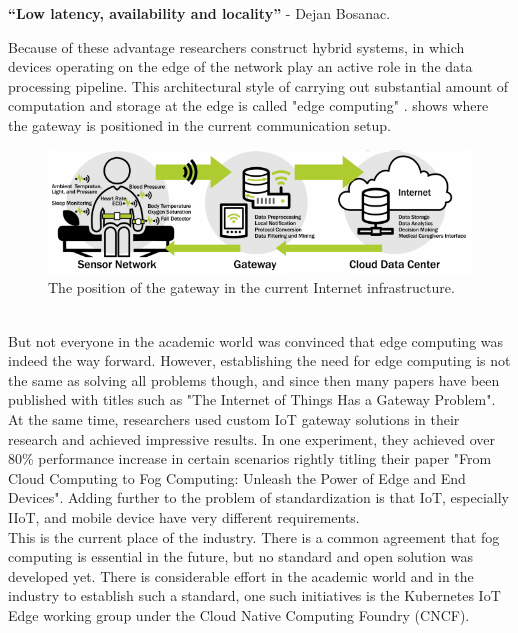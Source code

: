 {\begin{displayquote}
{\textbf{``Low latency, availability and locality''}}\cite{IntroducingDejanBosanac:KubernetesIoTEdgeWorkingGroup} - Dejan Bosanac.
\end{displayquote}
Because of these advantage researchers construct hybrid systems, in which devices operating on the edge of the network play an active role in the data processing pipeline. This architectural style of carrying out substantial amount of computation and storage at the edge is called "edge computing" \cite{fogComputing:def}.  shows where the gateway is positioned in the current communication setup. 
 \begin{figure}[!h]
     \centering
     \includegraphics[scale=2]{figures/iotSetup.png}
     \caption{The position of the gateway in the current Internet infrastructure\cite{iotGatewaySlavesGraph}.}
     \label{fig:iotDeviceSetup}
 \end{figure}\\
But not everyone in the academic world was convinced that edge computing was indeed the way forward. 
However, establishing the need for edge computing is not the same as solving all problems though, and since then many papers have been published with titles such as "The Internet of Things Has a Gateway Problem"\cite{zachariah2015internetOfThingsHasGatewayProblem}. At the same time, researchers used custom IoT gateway solutions in their research and achieved impressive results. In one experiment, they achieved over 80\% performance increase in certain scenarios rightly titling their paper "From Cloud Computing to Fog Computing: Unleash the Power of Edge and End Devices"\cite{hong2017fromCloudtoIoTGatewayUnleashingTHePower}. Adding further to the problem of standardization is that IoT, especially IIoT, and mobile device have very different requirements.\\
This is the current place of the industry. There is a common agreement that fog computing is essential in the future, but no standard and open solution was developed yet. There is considerable effort in the academic world and in the industry to establish such a standard, one such initiatives is the Kubernetes IoT Edge working group under the Cloud Native Computing Foundry (CNCF). 




}
